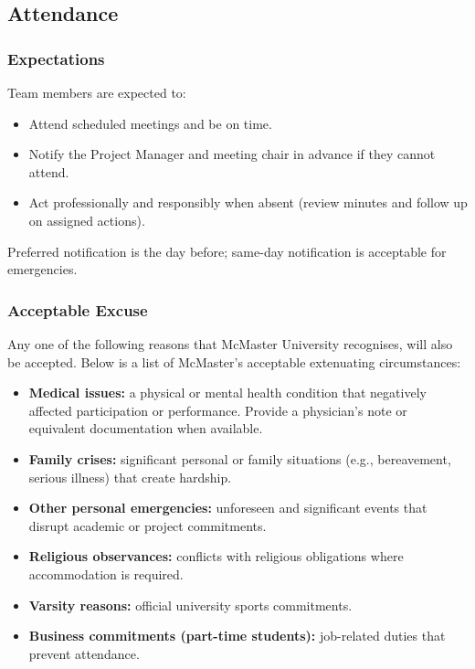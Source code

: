 \documentclass{article}
\begin{document}
\begin{enumerate}
\subsection*{Attendance}

\subsubsection*{Expectations}

Team members are expected to: 
\begin{itemize}
  \item Attend scheduled meetings and be on time.
  \item Notify the Project Manager and meeting chair in advance if they cannot attend.
  \item Act professionally and responsibly when absent (review minutes and follow up on assigned actions).
\end{itemize}

Preferred notification is the day before; same-day notification is acceptable for emergencies.

\subsubsection*{Acceptable Excuse}

Any one of the following reasons that McMaster University recognises, will also be accepted. Below is a list of McMaster's acceptable extenuating circumstances:

\begin{itemize}
  \item \textbf{Medical issues:} a physical or mental health condition that negatively affected participation or performance. Provide a physician's note or equivalent documentation when available.
  \item \textbf{Family crises:} significant personal or family situations (e.g., bereavement, serious illness) that create hardship.
  \item \textbf{Other personal emergencies:} unforeseen and significant events that disrupt academic or project commitments.
  \item \textbf{Religious observances:} conflicts with religious obligations where accommodation is required.
  \item \textbf{Varsity reasons:} official university sports commitments.
  \item \textbf{Business commitments (part-time students):} job-related duties that prevent attendance.
\end{itemize}


\end{enumerate}
\end{document}
